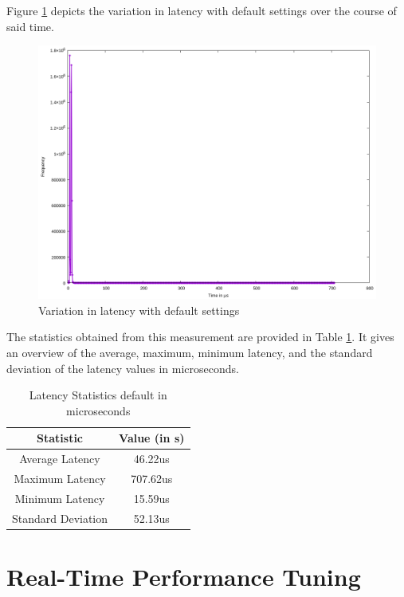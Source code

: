 \documentclass[MMR,Master,english]{twbook}
\begin{document}
Figure \ref{fig:gnuplot_max_latency_default} depicts the variation in latency with default settings over the course of said time. 

\begin{figure}[H]
	\centering
	\includegraphics[width=0.7\columnwidth]{masterthesis-documentation/docs/sigmatek/xenomai/1default/gnuplot_max_latency_default.png}
	\caption[Variation in latency with default settings]{Variation in latency with default settings}
	\label{fig:gnuplot_max_latency_default}
\end{figure}

\noindent The statistics obtained from this measurement are provided in Table \ref{tab:x}. It gives an overview of the average, maximum, minimum latency, and the standard deviation of the latency values in microseconds. 

\clearpage

\begin{table}[h]
	\centering
	\caption{Latency Statistics default in microseconds}
	\label{tab:x}
	\begin{tabular}{|c|c|}\hline
	\textbf{Statistic} & \textbf{Value (in \textmu s)} \\\hline
	Average Latency & 46.22us \\\hline
	Maximum Latency & 707.62us \\\hline
	Minimum Latency & 15.59us \\\hline
	Standard Deviation & 52.13us \\\hline
	\end{tabular}
	\end{table}
\clearpage

\chapter{Real-Time Performance Tuning}\label{cha:real-time_tuning}
\end{document}

